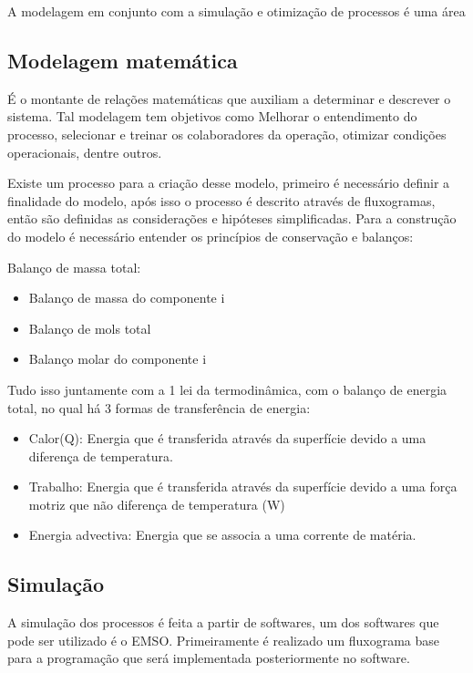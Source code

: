 \documentclass[
	12pt,				%
	openright,			%
	oneside,			%
	a4paper,			%
	english,			%
	french,				%
	spanish,			%
	brazil				%
	]{abntex2}
\begin{document}
A modelagem em conjunto com a simulação e otimização de processos é uma área 

\subsection{Modelagem matemática}

É o montante de relações matemáticas que auxiliam a determinar e descrever o sistema.	Tal modelagem tem objetivos como Melhorar o entendimento do processo, selecionar e treinar os colaboradores da operação, otimizar condições operacionais, dentre outros. \cite{souza2020modelagem}

Existe um processo para a criação desse modelo, primeiro é necessário definir a finalidade do modelo, após isso o processo é descrito através de fluxogramas, então são definidas as considerações e hipóteses simplificadas.
Para a construção do modelo é necessário entender os princípios de conservação e balanços:

Balanço de massa total:
\begin{itemize}
\item Balanço de massa do componente i
\item Balanço de mols total
\item Balanço molar do componente i
\end{itemize}

Tudo isso juntamente com a 1 lei da termodinâmica, com o balanço de energia total, no qual há 3 formas de transferência de energia:

\begin{itemize}
\item Calor(Q): Energia que é transferida através da superfície devido a uma diferença de temperatura.
\item Trabalho: Energia que é transferida através da superfície devido a uma força motriz que não diferença de temperatura (W)
\item Energia advectiva: Energia que se associa a uma corrente de matéria.
\end{itemize}

\subsection{Simulação} 

A simulação dos processos é feita a partir de softwares, um dos softwares que pode ser utilizado é o EMSO. Primeiramente é realizado um fluxograma base para a programação que será implementada posteriormente no software. \cite{souza2020modelagem}
\end{document}
